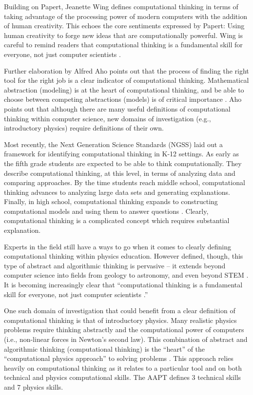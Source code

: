 \documentclass{msuphddissertation}
\begin{document}
\begin{doublespace}
Building on Papert, Jeanette Wing defines computational thinking in terms of taking advantage of the processing power of modern computers with the addition of human creativity.  This echoes the core sentiments expressed by Papert: Using human creativity to forge new ideas that are computationally powerful.  Wing is careful to remind readers that computational thinking is a fundamental skill for everyone, not just computer scientists \cite{Wing2008}.

Further elaboration by Alfred Aho points out that the process of finding the right tool for the right job is a clear indicator of computational thinking.  Mathematical abstraction (modeling) is at the heart of computational thinking, and be able to choose between competing abstractions (models) is of critical importance \cite{Aho2012}.  Aho points out that although there are many useful definitions of computational thinking within computer science, new domains of investigation (e.g., introductory physics) require definitions of their own.

Most recently, the Next Generation Science Standards (NGSS) laid out a framework for identifying computational thinking in K-12 settings.  As early as the fifth grade students are expected to be able to think computationally.  They describe computational thinking, at this level, in terms of analyzing data and comparing approaches.  By the time students reach middle school, computational thinking advances to analyzing large data sets and generating explanations.  Finally, in high school, computational thinking expands to constructing computational models and using them to answer questions \cite{NGSS2012}.  Clearly, computational thinking is a complicated concept which requires substantial explanation.

Experts in the field still have a ways to go when it comes to clearly defining computational thinking within physics education.  However defined, though, this type of abstract and algorithmic thinking is pervasive -- it extends beyond computer science into fields from geology to astronomy, and even beyond STEM \cite{Bundy2007}.  It is becoming increasingly clear that ``computational thinking is a fundamental skill for everyone, not just computer scientists \cite{Wing2006}.''

One such domain of investigation that could benefit from a clear definition of computational thinking is that of introductory physics.  Many realistic physics problems require thinking abstractly and the computational power of computers (i.e., non-linear forces in Newton's second law).  This combination of abstract and algorithmic thinking (computational thinking) is the ``heart'' of the ``computational physics approach'' to solving problems \cite{AAPT2016}.  This approach relies heavily on computational thinking as it relates to a particular tool and on both technical and physics computational skills.  The AAPT defines 3 technical skills and 7 physics skills.


\end{doublespace}
\end{document}
